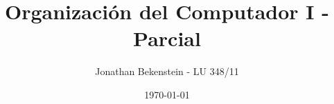 
\usepackage{pdfpages}

\title{Organización del Computador I - \textbf{Parcial}}
\author{Jonathan Bekenstein - \small{LU 348/11}}
\date{\today}





\maketitle

\hrulefill








